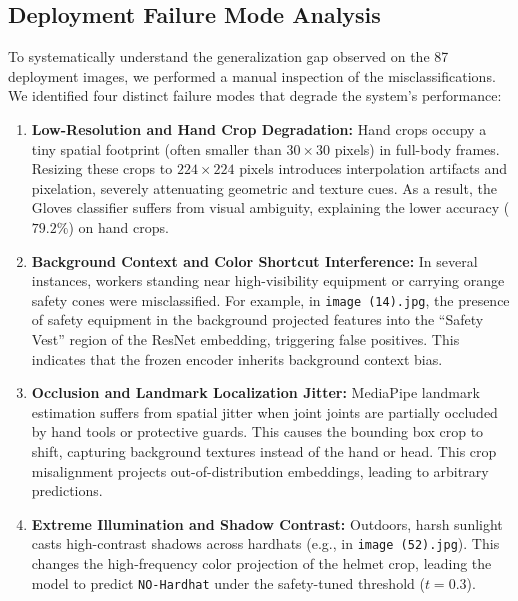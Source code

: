 \documentclass[11pt,a4paper]{article}
\begin{document}
\subsection{Deployment Failure Mode Analysis}
\label{sec:failure_modes}
To systematically understand the generalization gap observed on the 87 deployment images, we performed a manual inspection of the misclassifications. We identified four distinct failure modes that degrade the system's performance:
\begin{enumerate}
  \item \textbf{Low-Resolution and Hand Crop Degradation:} Hand crops occupy a tiny spatial footprint (often smaller than $30 \times 30$ pixels) in full-body frames. Resizing these crops to $224 \times 224$ pixels introduces interpolation artifacts and pixelation, severely attenuating geometric and texture cues. As a result, the Gloves classifier suffers from visual ambiguity, explaining the lower accuracy ($79.2\%$) on hand crops.
  \item \textbf{Background Context and Color Shortcut Interference:} In several instances, workers standing near high-visibility equipment or carrying orange safety cones were misclassified. For example, in \texttt{image (14).jpg}, the presence of safety equipment in the background projected features into the ``Safety Vest'' region of the ResNet embedding, triggering false positives. This indicates that the frozen encoder inherits background context bias.
  \item \textbf{Occlusion and Landmark Localization Jitter:} MediaPipe landmark estimation suffers from spatial jitter when joint joints are partially occluded by hand tools or protective guards. This causes the bounding box crop to shift, capturing background textures instead of the hand or head. This crop misalignment projects out-of-distribution embeddings, leading to arbitrary predictions.
  \item \textbf{Extreme Illumination and Shadow Contrast:} Outdoors, harsh sunlight casts high-contrast shadows across hardhats (e.g., in \texttt{image (52).jpg}). This changes the high-frequency color projection of the helmet crop, leading the model to predict \texttt{NO-Hardhat} under the safety-tuned threshold ($t=0.3$).
\end{enumerate}
\end{document}
